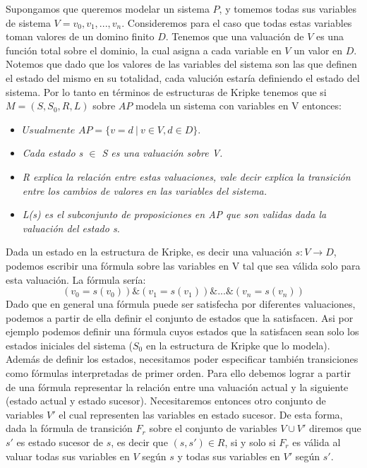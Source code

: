 \documentclass[titlepage, 12pt]{book}
\begin{document}
Supongamos que queremos modelar un sistema $P$, y tomemos todas sus variables de sistema $V = {v_0,v_1,...,v_n}$. Consideremos para el caso que todas estas variables toman valores de un domino finito $D$. Tenemos que una valuaci\'on de $V$ es una funci\'on total sobre el dominio, la cual asigna a cada variable en $V$ un valor en $D$. Notemos que dado que los valores de las variables del sistema son las que definen el estado del mismo en su totalidad, cada valuci\'on estar\'ia definiendo el estado del sistema. Por lo tanto en t\'erminos de estructuras de Kripke tenemos que si $M = (S,S_0,R,L)$ sobre $AP$ modela un sistema con variables en V entonces:
\begin{itemize}
\item $\textit{Usualmente } AP = \{v=d~|~ v \in V, d \in D\}.$
\item \textit{Cada estado s $\in$ S es una valuaci\'on sobre V.}
\item \textit{R explica la relaci\'on entre estas valuaciones, vale decir explica la transici\'on entre los cambios de valores en las variables del sistema.}
\item \textit{L(s) es el subconjunto de proposiciones en AP que son validas dada la valuaci\'on del estado s.}
\end{itemize}
Dada un estado en la estructura de Kripke, es decir una valuaci\'on $s:V\rightarrow D$, podemos escribir una f\'ormula sobre las variables en V tal que sea v\'alida solo para esta valuaci\'on\cite{Clarke}. La f\'ormula ser\'ia: $$(v_0 = s(v_0)) \& (v_1 = s(v_1)) \& ... \& (v_n = s(v_n))$$
Dado que en general una f\'ormula puede ser satisfecha por diferentes valuaciones, podemos a partir de ella definir el conjunto de estados que la satisfacen. Asi por ejemplo podemos definir una f\'ormula cuyos estados que la satisfacen sean solo los estados iniciales del sistema ($S_0$ en la estructura de Kripke que lo modela).\\

Adem\'as de definir los estados, necesitamos poder especificar tambi\'en transiciones como f\'ormulas interpretadas de primer orden. Para ello debemos lograr a partir de una f\'ormula representar la relaci\'on entre una valuaci\'on actual y la siguiente (estado actual y estado sucesor). Necesitaremos entonces otro conjunto de variables $V'$ el cual representen las variables en estado sucesor. De esta forma, dada la f\'ormula de transici\'on $F_r$ sobre el conjunto de variables $V \cup V'$ diremos que $s'$ es estado sucesor de $s$, es decir que $(s,s')\in R$, si y solo si $F_r$ es v\'alida al valuar todas sus variables en $V$ seg\'un $s$ y todas sus variables en $V'$ seg\'un $s'$.\\
\end{document}
